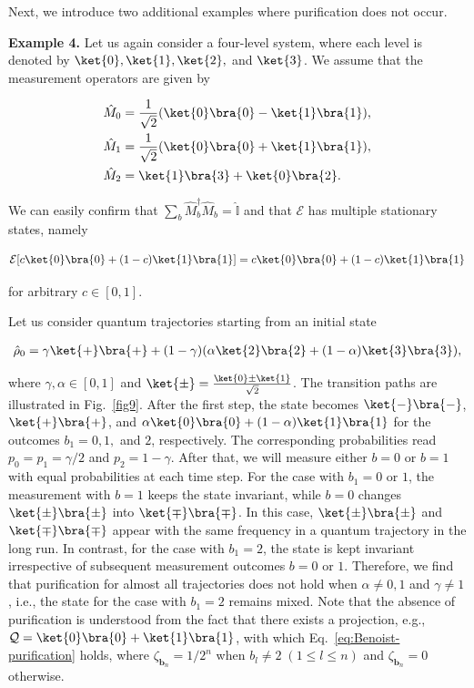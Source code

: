 \documentclass[preprint,pteplogo]{ptephy_v2}%
\numberwithin{equation}{section}
\theoremstyle{definition}
\newcommand{\ml}[1]{\mathcal{#1}}
\newcommand{\mbb}[1]{\mathbb{#1}}
\newcommand{\ketbra}[1]{\ket{#1}\bra{#1}}
\newcommand{\aln}[1]{
\begin{align}
#1
\end{align}
}
\begin{document}
Next, we introduce two additional examples where purification does not occur.


\textbf{Example 4.}
Let us again consider a four-level system, where each level is denoted by $\ket{0},\ket{1},\ket{2},$ and $\ket{3}$.
We assume that the measurement operators are given by
\aln{
\begin{split}
\hat{M}_0&=\frac{1}{\sqrt{2}}(\ket{0}\bra{0}-\ketbra{1}),\\
\hat{M}_1&=\frac{1}{\sqrt{2}}(\ket{0}\bra{0}+\ket{1}\bra{1}),\\
\hat{M}_2&=\ket{1}\bra{3}+\ket{0}\bra{2}.
\end{split}}
We can easily confirm that $\sum_b\hat{M}_b^\dag\hat{M}_b=\hat{\mbb{I}}$ and that $\ml{E}$ has multiple stationary states, namely
\aln{
\ml{E}[c\ket{0}\bra{0}+(1-c)\ket{1}\bra{1}]=c\ket{0}\bra{0}+(1-c)\ket{1}\bra{1}
}
for arbitrary $c\in[0,1]$.

Let us consider quantum trajectories starting from an initial state
\aln{
\hat{\rho}_0=\gamma\ket{+}\bra{+}+(1-\gamma)(\alpha\ket{2}\bra{2}+(1-\alpha)\ket{3}\bra{3}),
}
where $\gamma,\alpha\in [0,1]$ and $\ket{\pm}=\frac{\ket{0}\pm\ket{1}}{\sqrt{2}}$.
The transition paths are illustrated in Fig.~\ref{fig9}.
After the first step, the state becomes $\ketbra{-}$, $\ketbra{+}$, and ${\alpha\ketbra{0}+(1-\alpha)\ketbra{1}}$ for the outcomes $b_1=0,1,$ and $2$, respectively.
The corresponding probabilities read $p_0=p_1=\gamma/2$ and $p_2=1-\gamma$.
After that, we will measure either $b=0$ or $b=1$ with equal probabilities at each time step.
For the case with $b_1=0$ or $1$, the measurement with $b=1$ keeps the state invariant, while $b=0$ changes $\ketbra{\pm}$ into $\ketbra{\mp}$.
In this case, $\ketbra{\pm}$ and $\ketbra{\mp}$ appear with the same frequency in a quantum trajectory in the long run.
In contrast, for the case with $b_1=2$, the state is kept invariant irrespective of subsequent measurement outcomes $b=0$ or $1$.
Therefore, we find that purification for almost all trajectories does not hold when $\alpha\neq 0,1$ and $\gamma\neq 1$, i.e., the state for the case with $b_1=2$ remains mixed.
Note that the absence of purification is understood from the fact that there exists a projection, e.g., $\ml{Q}=\ketbra{0}+\ketbra{1}$, with which Eq.~\eqref{eq:Benoist-purification} holds, where $\zeta_{\bm{b}_n}=1/2^{n}$ when $b_l\neq 2\;(1\leq l \leq n)$ and $\zeta_{\bm{b}_n}=0$ otherwise.
\end{document}
